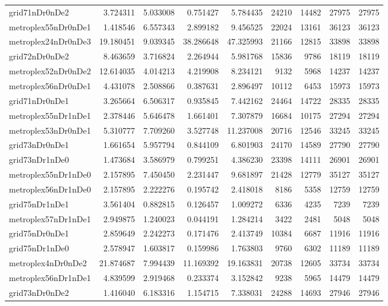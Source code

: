 \begin{longtable}{|l|r|r|r|r|r|r|r|r|}
grid71nDr0nDe2 & 3.724311 & 5.033008 & 0.751427 & 5.784435 & 24210 & 14482 & 27975 & 27975 \\
metroplex55nDr0nDe1 & 1.418546 & 6.557343 & 2.899182 & 9.456525 & 22024 & 13161 & 36123 & 36123 \\
metroplex24nDr0nDe3 & 19.180451 & 9.039345 & 38.286648 & 47.325993 & 21166 & 12815 & 33898 & 33898 \\
grid72nDr0nDe2 & 8.463659 & 3.716824 & 2.264944 & 5.981768 & 15836 & 9786 & 18119 & 18119 \\
metroplex52nDr0nDe2 & 12.614035 & 4.014213 & 4.219908 & 8.234121 & 9132 & 5968 & 14237 & 14237 \\
metroplex56nDr0nDe1 & 4.431078 & 2.508866 & 0.387631 & 2.896497 & 10112 & 6453 & 15973 & 15973 \\
grid71nDr0nDe1 & 3.265664 & 6.506317 & 0.935845 & 7.442162 & 24464 & 14722 & 28335 & 28335 \\
metroplex55nDr1nDe1 & 2.378446 & 5.646478 & 1.661401 & 7.307879 & 16684 & 10175 & 27294 & 27294 \\
metroplex53nDr0nDe1 & 5.310777 & 7.709260 & 3.527748 & 11.237008 & 20716 & 12546 & 33245 & 33245 \\
grid73nDr0nDe1 & 1.661654 & 5.957794 & 0.844109 & 6.801903 & 24170 & 14589 & 27790 & 27790 \\
grid73nDr1nDe0 & 1.473684 & 3.586979 & 0.799251 & 4.386230 & 23398 & 14111 & 26901 & 26901 \\
metroplex55nDr1nDe0 & 2.157895 & 7.450450 & 2.231447 & 9.681897 & 21428 & 12779 & 35127 & 35127 \\
metroplex56nDr1nDe0 & 2.157895 & 2.222276 & 0.195742 & 2.418018 & 8186 & 5358 & 12759 & 12759 \\
grid75nDr1nDe1 & 3.561404 & 0.882815 & 0.126457 & 1.009272 & 6336 & 4235 & 7239 & 7239 \\
metroplex57nDr1nDe1 & 2.949875 & 1.240023 & 0.044191 & 1.284214 & 3422 & 2481 & 5048 & 5048 \\
grid75nDr0nDe1 & 2.859649 & 2.242273 & 0.171476 & 2.413749 & 10384 & 6687 & 11916 & 11916 \\
grid75nDr1nDe0 & 2.578947 & 1.603817 & 0.159986 & 1.763803 & 9760 & 6302 & 11189 & 11189 \\
metroplex4nDr0nDe2 & 21.874687 & 7.994439 & 11.169392 & 19.163831 & 20738 & 12605 & 33734 & 33734 \\
metroplex56nDr1nDe1 & 4.839599 & 2.919468 & 0.233374 & 3.152842 & 9238 & 5965 & 14479 & 14479 \\
grid73nDr0nDe2 & 1.416040 & 6.183316 & 1.154715 & 7.338031 & 24288 & 14693 & 27946 & 27946 \\

\end{longtable}
